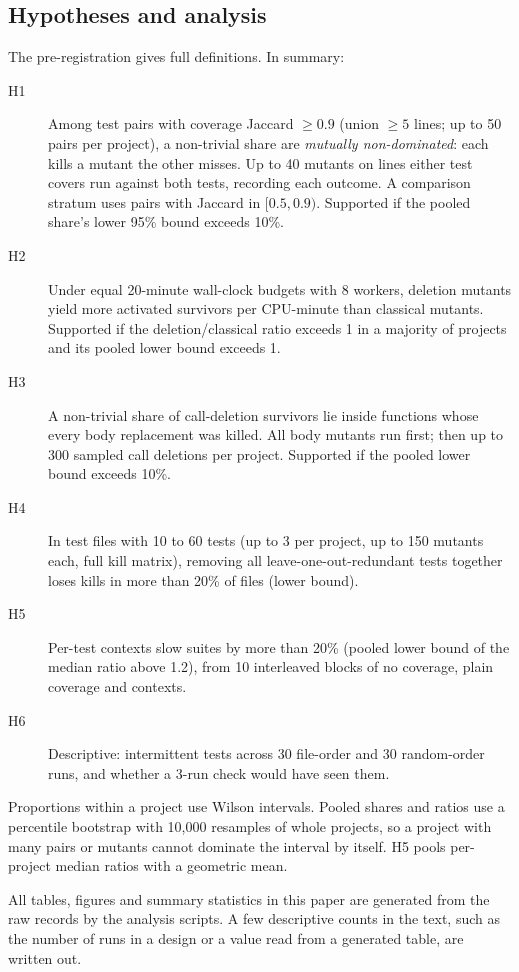 \subsection{Hypotheses and analysis}

The pre-registration gives full definitions. In summary:
\begin{description}
  \item[H1] Among test pairs with coverage Jaccard $\geq 0.9$ (union $\geq 5$ lines; up to 50 pairs per project), a non-trivial share are \emph{mutually non-dominated}: each kills a mutant the other misses. Up to 40 mutants on lines either test covers run against both tests, recording each outcome. A comparison stratum uses pairs with Jaccard in $[0.5, 0.9)$. Supported if the pooled share's lower 95\% bound exceeds 10\%.
  \item[H2] Under equal 20-minute wall-clock budgets with 8 workers, deletion mutants yield more activated survivors per CPU-minute than classical mutants. Supported if the deletion/classical ratio exceeds 1 in a majority of projects and its pooled lower bound exceeds 1.
  \item[H3] A non-trivial share of call-deletion survivors lie inside functions whose every body replacement was killed. All body mutants run first; then up to 300 sampled call deletions per project. Supported if the pooled lower bound exceeds 10\%.
  \item[H4] In test files with 10 to 60 tests (up to 3 per project, up to 150 mutants each, full kill matrix), removing all leave-one-out-redundant tests together loses kills in more than 20\% of files (lower bound).
  \item[H5] Per-test contexts slow suites by more than 20\% (pooled lower bound of the median ratio above 1.2), from 10 interleaved blocks of no coverage, plain coverage and contexts.
  \item[H6] Descriptive: intermittent tests across 30 file-order and 30 random-order runs, and whether a 3-run check would have seen them.
\end{description}

Proportions within a project use Wilson intervals. Pooled shares and ratios use a percentile bootstrap with 10,000 resamples of whole projects, so a project with many pairs or mutants cannot dominate the interval by itself. H5 pools per-project median ratios with a geometric mean.

All tables, figures and summary statistics in this paper are generated from the raw records by the analysis scripts. A few descriptive counts in the text, such as the number of runs in a design or a value read from a generated table, are written out.
